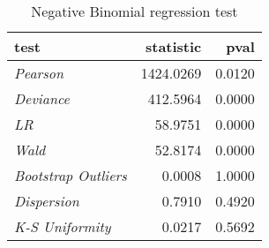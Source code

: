 \begin{table}[H]

\caption{\label{tab:negbin_reg_tests}Negative Binomial regression test}
\centering
\begin{tabular}[t]{>{}l|r|r}
\hline
test & statistic & pval\\
\hline
\hline
\em{Pearson} & 1424.0269 & 0.0120\\
\hline
\em{Deviance} & 412.5964 & 0.0000\\
\hline
\em{LR} & 58.9751 & 0.0000\\
\hline
\em{Wald} & 52.8174 & 0.0000\\
\hline
\em{Bootstrap Outliers} & 0.0008 & 1.0000\\
\hline
\em{Dispersion} & 0.7910 & 0.4920\\
\hline
\em{K-S Uniformity} & 0.0217 & 0.5692\\
\hline
\end{tabular}
\end{table}